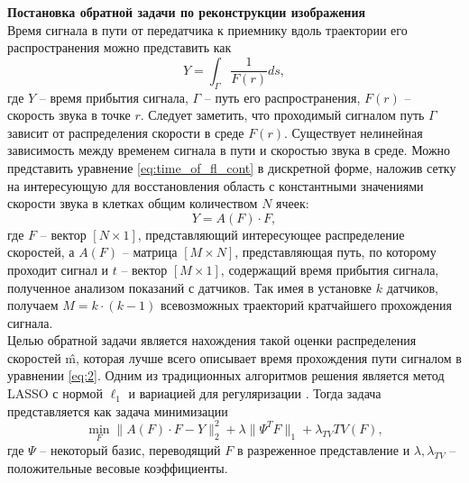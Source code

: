 \documentclass[14pt]{matmex-diploma}
\begin{document}
\textbf{Постановка обратной задачи по реконструкции изображения}\\
Время сигнала в пути от передатчика к приемнику вдоль траектории его распространения можно представить как 
\begin{equation}\label{eq:time_of_fl_cont}
Y = \int_\Gamma \frac{1}{F(r)}ds,
\end{equation}
где $Y$ -- время прибытия сигнала, $\Gamma$ -- путь его распространения, $F(r)$ -- скорость звука в точке $r$. Следует заметить, что проходимый сигналом путь $\Gamma$ зависит от распределения скорости в среде $F(r)$. Существует нелинейная зависимость между временем сигнала в пути и скоростью звука в среде. Можно представить уравнение \eqref{eq:time_of_fl_cont} в дискретной форме, наложив сетку на интересующую для восстановления область с константными значениями скорости звука в клетках общим количеством $N$ ячеек:
\begin{equation}\label{eq:2}
Y = A(F)\cdot F,
\end{equation}
где $F$ -- вектор $[N\times 1]$, представляющий интересующее распределение скоростей, а $A(F)$ -- матрица $[M\times N]$, представляющая путь, по которому проходит сигнал и $t$ -- вектор $[M\times 1]$, содержащий время прибытия сигнала, полученное анализом показаний с датчиков. Так имея в установке $k$ датчиков, получаем $M = k\cdot (k-1)$ всевозможных траекторий кратчайшего прохождения сигнала. \\
Целью обратной задачи является нахождения такой оценки распределения скоростей \^{m}, которая лучше всего описывает время прохождения пути сигналом в уравнении \eqref{eq:2}. Одним из традиционных алгоритмов решения является метод LASSO с нормой $\ell_1$ и вариацией для регуляризации \cite{hormati2010robust}. Тогда задача представляется как задача минимизации
\begin{equation}
\label{eq:lasso}
\min_F \| A(F) \cdot F - Y \|_2^2 + \lambda \| \Psi^T F \|_1 + \lambda_{TV} TV(F),
\end{equation}
где $\Psi$ -- некоторый базис, переводящий $F$ в разреженное представление и $\lambda, \lambda_{TV}$  -- положительные весовые коэффициенты. 
\end{document}
